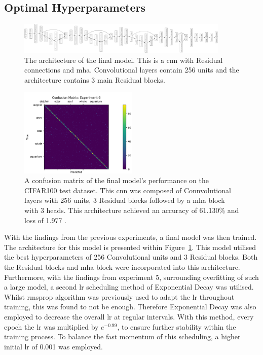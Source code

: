 \documentclass[11pt]{article}
\def\BESTWIDTH{256 }
\def\BESTDEPTH{3 }
\def\DATASET{CIFAR100 }
\def\FINALACCURACY{61.130\% }
\def\FINALLOSS{1.977 }
\begin{document}
\subsection{Optimal Hyperparameters}
\begin{figure}
\centering
\includegraphics[width=0.9\textwidth]{Figures/experiment_6_arch.png}
\caption{The architecture of the final model. This is a \acrshort{cnn} with Residual connections and \acrfull{mha}. Convolutional layers contain \BESTWIDTH units and the architecture contains \BESTDEPTH main Residual blocks.}
\label{fig: Final Architecture}
\end{figure}
\setcounter{figure}{0}
\begin{figure}
\centering
\includegraphics[width=0.5\textwidth]{Figures/Final_Confusion_Matrix.png}
\caption{A confusion matrix of the final model's performance on the \DATASET test dataset. This \acrshort{cnn} was composed of Connvolutional layers with \BESTWIDTH units, \BESTDEPTH Residual blocks followed by a \acrshort{mha} block with 3 heads. This architecture achieved an accuracy of \FINALACCURACY and loss of \FINALLOSS.}
\label{fig: Confusion Matrix}
\end{figure}
With the findings from the previous experiments, a final model was then trained. The architecture for this model is presented within Figure~\ref{fig: Final Architecture}. This model utilised the best hyperparameters of \BESTWIDTH Convolutional units and \BESTDEPTH Residual blocks.  Both the Residual blocks and \acrshort{mha} block were incorporated into this architecture.\\
Furthermore, with the findings from experiment 5, surrounding overfitting of such a large model, a second \acrshort{lr} scheduling method of Exponential Decay was utilised. Whilst \acrshort{rmsprop} algorithm was previously used to adapt the \acrshort{lr} throughout training, this was found to not be enough. Therefore Exponential Decay was also employed to decrease the overall \acrshort{lr} at regular intervals. With this method, every epoch the \acrshort{lr} was multiplied by $e^{-0.99}$, to ensure further stability within the training process. To balance the fast momentum of this scheduling, a higher initial \acrshort{lr} of 0.001 was employed.\\
\end{document}
